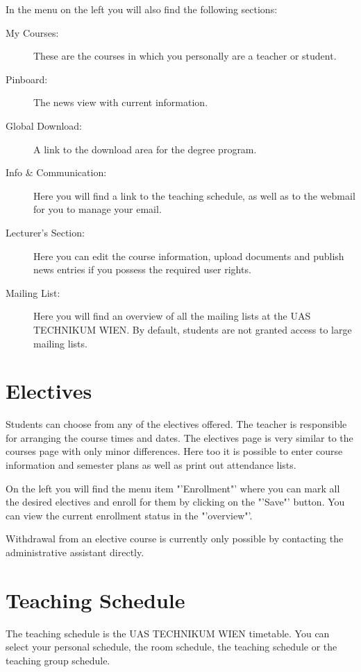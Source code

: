 In the menu on the left you will also find the following sections:
\begin{description}
	\item [My Courses:] These are the courses in which you personally are a teacher or student.
	\item [Pinboard:] The news view with current information.
	\item [Global Download:] A link to the download area for the degree program.
	\item [Info \& Communication:] Here you will find a link to the teaching schedule, as well as to the webmail for you to manage your email.
	\item [Lecturer's Section:] Here you can edit the course information, upload documents and publish news entries if you possess the required user rights.
	\item [Mailing List:] Here you will find an overview of all the mailing lists at the UAS TECHNIKUM WIEN. By default, students are not granted access to large mailing lists.
\end{description}

\section{Electives}
\label{lehre_freifaecher}

Students can choose from any of the electives offered. The teacher is responsible for arranging the course times and dates.
The electives page is very similar to the courses page with only minor differences.
Here too it is possible to enter course information and semester plans as well as print out attendance lists.

On the left you will find the menu item "'Enrollment"' where you can mark all the desired electives and enroll for them by clicking on the "'Save"' button.
You can view the current enrollment status in the "'overview"'.

Withdrawal from an elective course is currently only possible by contacting the administrative assistant directly.

\section{Teaching Schedule}
\label{lehre_lvplan}

The teaching schedule is the UAS TECHNIKUM WIEN timetable.
You can select your personal schedule, the room schedule, the teaching schedule or the teaching group schedule.

